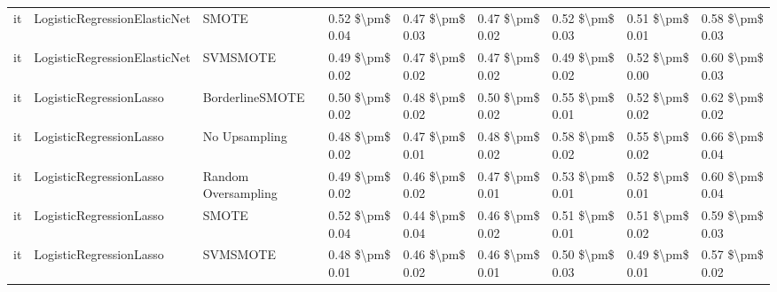 \begin{tabular}{lllllllll}
      it &    LogisticRegressionElasticNet &                         SMOTE &     0.52 \$\textbackslash pm\$ 0.04 &           0.47 \$\textbackslash pm\$ 0.03 &       0.47 \$\textbackslash pm\$ 0.02 &        0.52 \$\textbackslash pm\$ 0.03 &                         0.51 \$\textbackslash pm\$ 0.01 &     0.58 \$\textbackslash pm\$ 0.03 \\
      it &    LogisticRegressionElasticNet &                      SVMSMOTE &     0.49 \$\textbackslash pm\$ 0.02 &           0.47 \$\textbackslash pm\$ 0.02 &       0.47 \$\textbackslash pm\$ 0.02 &        0.49 \$\textbackslash pm\$ 0.02 &                         0.52 \$\textbackslash pm\$ 0.00 &     0.60 \$\textbackslash pm\$ 0.03 \\
      it &         LogisticRegressionLasso &               BorderlineSMOTE &     0.50 \$\textbackslash pm\$ 0.02 &           0.48 \$\textbackslash pm\$ 0.02 &       0.50 \$\textbackslash pm\$ 0.02 &        0.55 \$\textbackslash pm\$ 0.01 &                         0.52 \$\textbackslash pm\$ 0.02 &     0.62 \$\textbackslash pm\$ 0.02 \\
      it &         LogisticRegressionLasso &                 No Upsampling &     0.48 \$\textbackslash pm\$ 0.02 &           0.47 \$\textbackslash pm\$ 0.01 &       0.48 \$\textbackslash pm\$ 0.02 &        0.58 \$\textbackslash pm\$ 0.02 &                         0.55 \$\textbackslash pm\$ 0.02 &     0.66 \$\textbackslash pm\$ 0.04 \\
      it &         LogisticRegressionLasso &           Random Oversampling &     0.49 \$\textbackslash pm\$ 0.02 &           0.46 \$\textbackslash pm\$ 0.02 &       0.47 \$\textbackslash pm\$ 0.01 &        0.53 \$\textbackslash pm\$ 0.01 &                         0.52 \$\textbackslash pm\$ 0.01 &     0.60 \$\textbackslash pm\$ 0.04 \\
      it &         LogisticRegressionLasso &                         SMOTE &     0.52 \$\textbackslash pm\$ 0.04 &           0.44 \$\textbackslash pm\$ 0.04 &       0.46 \$\textbackslash pm\$ 0.02 &        0.51 \$\textbackslash pm\$ 0.01 &                         0.51 \$\textbackslash pm\$ 0.02 &     0.59 \$\textbackslash pm\$ 0.03 \\
      it &         LogisticRegressionLasso &                      SVMSMOTE &     0.48 \$\textbackslash pm\$ 0.01 &           0.46 \$\textbackslash pm\$ 0.02 &       0.46 \$\textbackslash pm\$ 0.01 &        0.50 \$\textbackslash pm\$ 0.03 &                         0.49 \$\textbackslash pm\$ 0.01 &     0.57 \$\textbackslash pm\$ 0.02 \\

\end{tabular}
